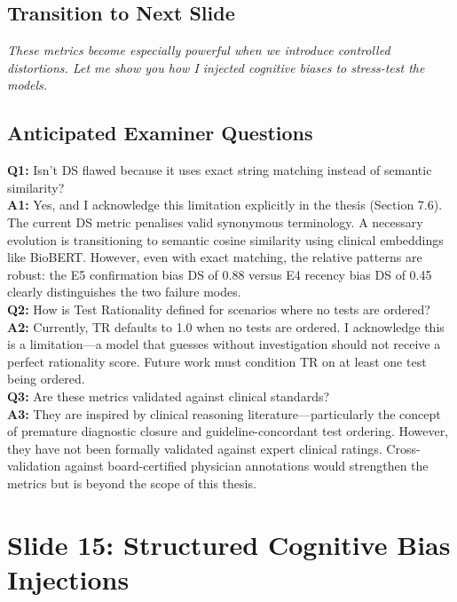 \subsection*{Transition to Next Slide}
{\color{transgreen}
\textit{These metrics become especially powerful when we introduce controlled distortions. Let me show you how I injected cognitive biases to stress-test the models.}
}

\subsection*{Anticipated Examiner Questions}
\begin{qabox}
\textbf{Q1:} Isn't DS flawed because it uses exact string matching instead of semantic similarity? \\
\textbf{A1:} Yes, and I acknowledge this limitation explicitly in the thesis (Section 7.6). The current DS metric penalises valid synonymous terminology. A necessary evolution is transitioning to semantic cosine similarity using clinical embeddings like BioBERT. However, even with exact matching, the relative patterns are robust: the E5 confirmation bias DS of 0.88 versus E4 recency bias DS of 0.45 clearly distinguishes the two failure modes. \\[6pt]
\textbf{Q2:} How is Test Rationality defined for scenarios where no tests are ordered? \\
\textbf{A2:} Currently, TR defaults to 1.0 when no tests are ordered. I acknowledge this is a limitation---a model that guesses without investigation should not receive a perfect rationality score. Future work must condition TR on at least one test being ordered. \\[6pt]
\textbf{Q3:} Are these metrics validated against clinical standards? \\
\textbf{A3:} They are inspired by clinical reasoning literature---particularly the concept of premature diagnostic closure and guideline-concordant test ordering. However, they have not been formally validated against expert clinical ratings. Cross-validation against board-certified physician annotations would strengthen the metrics but is beyond the scope of this thesis.
\end{qabox}



\section{Slide 15: Structured Cognitive Bias Injections}

